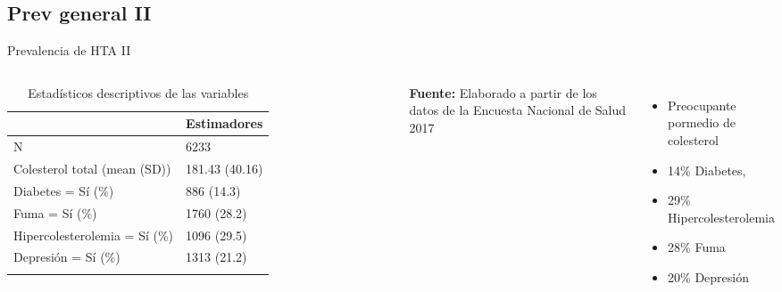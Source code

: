 \documentclass[aspectratio=169]{beamer}
\newcommand{\pro}{\item [$\blacktriangleright$]}
\begin{document}
\subsection*{Prev general II}
\begin{frame}{Prevalencia de HTA II}
        \begin{columns}[onlytextwidth]
\begin{table}{}
\caption{Estadísticos descriptivos de las variables}
    \centering
\begin{tabular}{l l}
\toprule
  & Estimadores \\
\midrule
N & 6233\\
Colesterol total (mean (SD)) & 181.43 (40.16)\\
Diabetes = Sí (\%) & 886 (14.3)\\
Fuma = Sí (\%) & 1760 (28.2)\\
Hipercolesterolemia = Sí (\%)&   1096 (29.5)\\
Depresión = Sí (\%) & 1313 (21.2)\\
\addlinespace
\bottomrule
\end{tabular}
    \vspace{1ex}
    
    {\raggedright \small \textbf{Fuente:} Elaborado a partir de los datos de la Encuesta Nacional de Salud 2017 \par}
\end{table}
    \begin{itemize}
    \pro Preocupante pormedio de colesterol
        \pro 14\% Diabetes, 
        \pro 29\% Hipercolesterolemia
        \pro 28\% Fuma
        \pro 20\% Depresión
    \end{itemize}
    \end{columns}
\end{frame}
\end{document}

